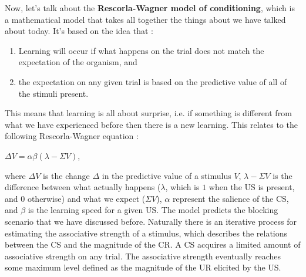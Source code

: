 \documentclass[11pt]{article}
\begin{document}
Now, let's talk about the \textbf{Rescorla-Wagner model of conditioning}, which is a mathematical model that takes all together the things about we have talked about today. It's based on the idea that :

\begin{enumerate}
\item Learning will occur if what happens on the trial does not match the expectation of the organism, and
\item the expectation on any given trial is based on the predictive value of all of the stimuli present.
\end{enumerate}

This means that learning is all about surprise, i.e. if something is different from what we have experienced before then there is a new learning. This relates to the following Rescorla-Wagner equation :

\begin{center}
$\Delta V = \alpha \beta (\lambda - \Sigma V)$,
\end{center}
where $\Delta V$ is the change $\Delta$ in the predictive value of a stimulus $V$, $\lambda - \Sigma V$ is the difference between what actually happens ($\lambda$, which is $1$ when the US is present, and $0$ otherwise) and what we expect ($\Sigma V$), $\alpha$ represent the salience of the CS, and $\beta$ is the learning speed for a given US. The model predicts the blocking scenario that we have discussed before. Naturally there is an iterative process for estimating the associative strength of a stimulus, which describes the relations between the CS and the magnitude of the CR. A CS acquires a limited amount of associative strength on any trial. The associative strength eventually reaches some maximum level defined as the magnitude of the UR elicited by the US.
\end{document}
